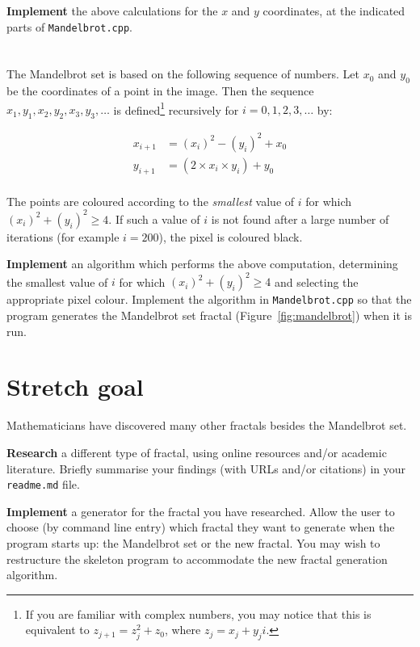 \textbf{Implement} the above calculations for the $x$ and $y$ coordinates, at the indicated parts of \texttt{Mandelbrot.cpp}.

\section{} \label{core-c-last}

The Mandelbrot set is based on the following sequence of numbers. Let $x_0$ and $y_0$ be the coordinates of a point in the image.
Then the sequence $x_1, y_1, x_2, y_2, x_3, y_3, \dots$ is defined\footnote{%
    If you are familiar with complex numbers, you may notice that this is equivalent to $z_{j+1} = z_j^2 + z_0$, where $z_j = x_j + y_j i$.
} recursively for $i = 0, 1, 2, 3, \dots$ by:

\begin{align*}
    x_{i+1} &= (x_i)^2 - (y_i)^2 + x_0 \\
    y_{i+1} &= (2 \times x_i \times y_i) + y_0 \\
\end{align*}

The points are coloured according to the \emph{smallest} value of $i$ for which $(x_i)^2 + (y_i)^2 \geq 4$.
If such a value of $i$ is not found after a large number of iterations (for example $i=200$), the pixel is coloured black.

\textbf{Implement} an algorithm which performs the above computation, determining the smallest value of $i$
for which $(x_i)^2 + (y_i)^2 \geq 4$ and selecting the appropriate pixel colour.
Implement the algorithm in \texttt{Mandelbrot.cpp} so that the program generates the Mandelbrot set fractal (Figure~\ref{fig:mandelbrot}) when it is run.

\section{Stretch goal} \label{stretch-c}

Mathematicians have discovered many other fractals besides the Mandelbrot set.

\textbf{Research} a different type of fractal, using online resources and/or academic literature.
Briefly summarise your findings (with URLs and/or citations) in your \texttt{readme.md} file.

\textbf{Implement} a generator for the fractal you have researched.
Allow the user to choose (by command line entry) which fractal they want to generate when the program starts up: the Mandelbrot set or the new fractal.
You may wish to restructure the skeleton program to accommodate the new fractal generation algorithm.
